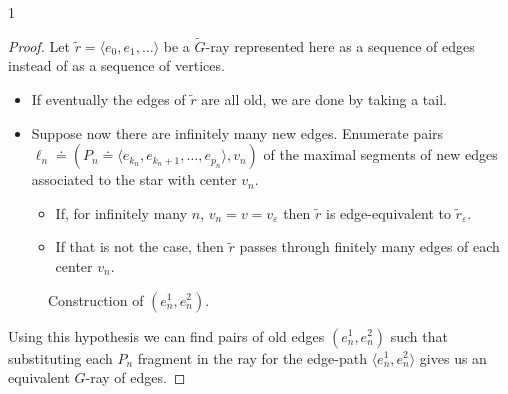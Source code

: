 \documentclass[10pt]{article}
\numberwithin{equation}{subsection}
\theoremstyle{remark}
\newcommand{\proofshow}{1}
\begin{document}
\if \proofshow 1
\begin{proof}
    Let $\tilde{r} = \langle e_0,e_1,\dots \rangle$ be a $\tilde{G}$-ray represented here as a sequence of edges instead of as a sequence of vertices. 
    \begin{itemize}
        \item If eventually the edges of $\tilde{r}$ are all old, we are done by taking a tail.
        \item Suppose now there are infinitely many new edges. Enumerate pairs $\ell_n \doteq (P_n \doteq \langle e_{k_n},e_{k_n+1},\dots,e_{p_n}\rangle,v_n) $ of the maximal segments of new edges associated to the star with center $v_n$.
        \begin{itemize}
            \item If, for infinitely many $n$, $v_n = v = v_\varepsilon$ then $\tilde{r}$ is edge-equivalent to $\tilde{r}_\varepsilon$.
            \item If that is not the case, then $\tilde{r}$ passes through finitely many edges of each center $v_n$.
        \end{itemize}
    \end{itemize}    

\begin{figure}[h!]
    \centering
\caption{Construction of $(e_n^1,e_n^2)$.}
\end{figure}
    
    Using this hypothesis we can find pairs of old edges $(e_n^1,e_n^2)$ such that substituting each $P_n$ fragment in the ray for the edge-path $\langle e_n^1,e_n^2 \rangle$ gives us an equivalent $G$-ray of edges.
\end{proof}
\fi 
\end{document}
